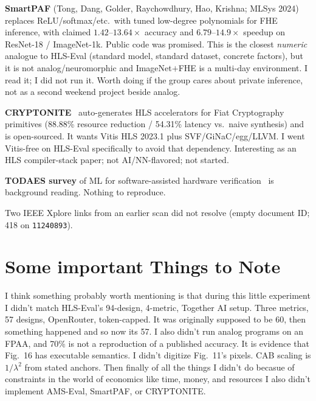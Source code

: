 \documentclass[11pt]{article}
\newcommand{\code}[1]{\texttt{#1}}
\begin{document}
\textbf{SmartPAF} (Tong, Dang, Golder, Raychowdhury, Hao, Krishna;
MLSys 2024)~\cite{smartpaf} replaces ReLU/softmax/etc.\ with tuned
low-degree polynomials for FHE inference, with claimed
$1.42$--$13.64\times$ accuracy and $6.79$--$14.9\times$ speedup on
ResNet-18 / ImageNet-1k. Public code was promised. This is the closest
\emph{numeric} analogue to HLS-Eval (standard model, standard
dataset, concrete factors), but it is not analog/neuromorphic and
ImageNet$+$FHE is a multi-day environment. I read it; I did not run it.
Worth doing if the group cares about private inference, not as a second
weekend project beside analog.

\textbf{CRYPTONITE}~\cite{cryptonite} auto-generates HLS accelerators
for Fiat Cryptography primitives (88.88\% resource reduction / 54.31\%
latency vs.\ naive synthesis) and is open-sourced. It wants Vitis HLS
2023.1 plus SVF/GiNaC/egg/LLVM. I went Vitis-free on HLS-Eval
specifically to avoid that dependency. Interesting as an HLS
compiler-stack paper; not AI/NN-flavored; not started.

\textbf{TODAES survey} of ML for software-assisted hardware
verification~\cite{survey} is background reading. Nothing to
reproduce.

Two IEEE Xplore links from an earlier scan did not resolve (empty
document ID; 418 on \code{11240893}).

\section{Some important Things to Note}

I think something probably worth mentioning is that during this little experiment I didn't match HLS-Eval's 94-design, 4-metric, Together AI
setup. Three metrics, 57 designs, OpenRouter, token-capped. It was originally supposed to be 60, then something happened and so now its 57. I also didn't run analog programs on an FPAA, and 70\% is not a
reproduction of a published accuracy. It is evidence that Fig.~16 has
executable semantics. I didn't digitize Fig.~11's pixels. CAB scaling is $1/\lambda^2$ from stated anchors. Then finally of all the things I didn't do becasue of constraints in the world of economics like time, money, and resources I also didn't implement AMS-Eval, SmartPAF, or CRYPTONITE.

\end{document}
